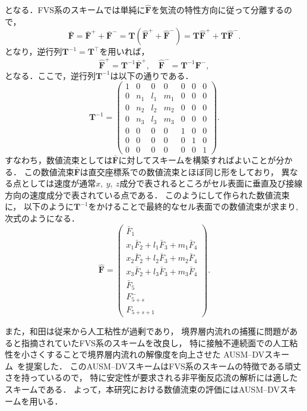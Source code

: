 となる．FVS系のスキームでは単純に$\hat{\bm{F}}$を気流の特性方向に従って分離するので，
\begin{equation}
    \bar{\bm{F}}=\bar{\bm{F}}^{+}+\bar{\bm{F}}^{-}=\bm{T}\left(\hat{\bm{F}}^{+}+\hat{\bm{F}}^{-}\right)=\bm{T} \hat{\bm{F}}^{+}+\bm{T} \hat{\bm{F}}^{-}.
\end{equation}
となり，逆行列$\bm{T}^{-1} = \bm{T}^\top$を用いれば，
\begin{equation}
\hat{\bm{F}}^{+}=\bm{T}^{-1} \bar{\bm{F}}^{+}, \quad \hat{\bm{F}}^{-}=\bm{T}^{-1} \bm{F}^{-},
\end{equation}
となる．ここで，逆行列$\bm{T}^{-1}$は以下の通りである．
\begin{equation}
\bm{T}^{-1}=\begin{pmatrix}
1 & 0 & 0 & 0 & 0 & 0 & 0 \\
0 & n_{1} & l_{1} & m_{1} & 0 & 0 & 0 \\
0 & n_{2} & l_{2} & m_{2} & 0 & 0 & 0 \\
0 & n_{3} & l_{3} & m_{3} & 0 & 0 & 0 \\
0 & 0 & 0 & 0 & 1 & 0 & 0 \\
0 & 0 & 0 & 0 & 0 & 1 & 0 \\
0 & 0 & 0 & 0 & 0 & 0 & 1
\end{pmatrix}.
\end{equation}
すなわち，数値流束としては$\bar{\bm{F}}$に対してスキームを構築すればよいことが分かる．
この数値流束$\bar{\bm{F}}$は直交座標系での数値流束とほぼ同じ形をしており，
異なる点としては速度が通常$x,\ y,\ z$成分で表されるところがセル表面に垂直及び接線方向の速度成分で表されている点である．
このようにして作られた数値流束に，
以下のように$\bm{T}^{-1}$をかけることで最終的なセル表面での数値流束が求まり,次式のようになる．
\begin{equation}
\label{eq:num-flux}
\hat{\bm{F}}=\begin{pmatrix}
\bar{F}_{1} \\
x_{1} \bar{F}_{2}+l_{1} \bar{F}_{3}+m_{1} \bar{F}_{4} \\
x_{2} \bar{F}_{2}+l_{2} \bar{F}_{3}+m_{2} \bar{F}_{4} \\
x_{3} \bar{F}_{2}+l_{3} \bar{F}_{3}+m_{3} \bar{F}_{4} \\
\bar{F}_{5} \\
F_{5+s}^{-} \\
F_{5+s+1}
\end{pmatrix}.
\end{equation}

また，和田は従来から人工粘性が過剰であり，
境界層内流れの捕獲に問題があると指摘されていたFVS系のスキームを改良し，
特に接触不連続面での人工粘性を小さくすることで境界層内流れの解像度を向上させた
AUSM–DVスキーム~\cite{ausmdv}を提案した．
このAUSM–DVスキームはFVS系のスキームの特徴である頑丈さを持っているので，
特に安定性が要求される非平衡反応流の解析には適したスキームである．
よって，本研究における数値流束の評価にはAUSM–DVスキームを用いる．

